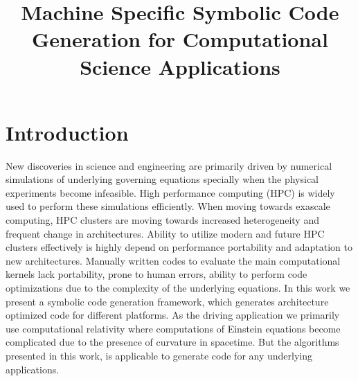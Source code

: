 \documentclass[10pt, conference]{IEEEtran} %
\begin{document}
%
\title{Machine Specific Symbolic Code Generation for Computational Science Applications}


\author{
}


\maketitle

\IEEEpeerreviewmaketitle

\section{Introduction}
New discoveries in science and engineering are primarily driven by numerical simulations of underlying governing equations specially when the physical experiments become infeasible. High performance computing (HPC) is widely used to perform these simulations efficiently. When moving towards exascale computing, HPC clusters are moving towards increased heterogeneity and frequent change in architectures. Ability to utilize modern and future HPC clusters effectively is highly depend on performance portability and adaptation to new architectures. Manually written codes to evaluate the main computational kernels lack portability, prone to human errors, ability to perform code optimizations due to the complexity of the underlying equations. In this work we present a symbolic code generation framework, which generates architecture optimized code for different platforms. As the driving application we primarily use computational relativity where computations of Einstein equations become complicated due to the presence of curvature in spacetime. But the algorithms presented in this work, is applicable to generate code for any underlying applications.
\end{document}
